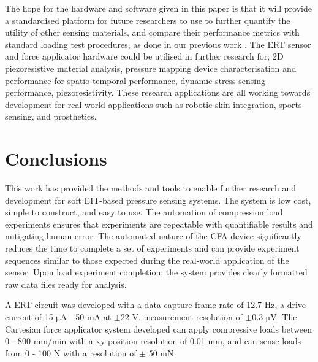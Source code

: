 The hope for the hardware and software given in this paper is that it will provide a standardised platform for future researchers to use to further quantify the utility of other sensing materials, and compare their performance metrics with standard loading test procedures, as done in our previous work \cite{Ellingham2024}. The ERT sensor and force applicator hardware could be utilised in further research for; 2D piezoresistive material analysis, pressure mapping device characterisation and performance for spatio-temporal performance, dynamic stress sensing performance, piezoresistivity. These research applications are all working towards development for real-world applications such as robotic skin integration, sports sensing, and prosthetics.





\section{Conclusions}
This work has provided the methods and tools to enable further research and development for soft EIT-based pressure sensing systems. The system is low cost, simple to construct, and easy to use. The automation of compression load experiments ensures that experiments are repeatable with quantifiable results and mitigating human error. The automated nature of the CFA device significantly reduces the time to complete a set of experiments and can provide experiment sequences similar to those expected during the real-world application of the sensor. Upon load experiment completion, the system provides clearly formatted raw data files ready for analysis.

A ERT circuit was developed with a data capture frame rate of 12.7 Hz, a drive current of 15 $\mathrm{\mu A}$ - 50 mA at $\pm$22 V, measurement resolution of $\pm$0.3 $\mathrm{\mu V}$. The Cartesian force applicator system developed can apply compressive loads between 0 - 800 mm/min with a xy position resolution of 0.01 mm, and can sense loads from 0 - 100 N with a resolution of $\pm$ 50 mN.

